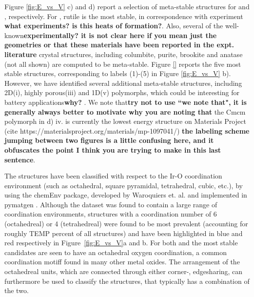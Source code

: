 Figure \ref{fig:E_vs_V} c) and d) report a selection of meta-stable structures for \IrOtwo and \IrOthree, respectively. For \IrOtwo, rutile is the most stable, in correspondence with experiment \cite{}\textbf{what experiments?  is this  heats of formation?}. Also, several of the well-known\textbf{experimentally?  it is not clear here if you mean just the geometries or that these materials have been reported in the expt. literature} crystal structures, including  columbite, purite, brookite and anatase (not all shown) are computed to be meta-stable.
Figure \ref{} reports the five most stable \IrOthree structures, corresponding to labels (1)-(5) in Figure \ref{fig:E_vs_V} b). However, we have identified several additional meta-stable structures, including 2D(i), highly porous(iii) and 1D(v) polymorphs, which could be interesting for battery applications\textbf{why?} \cite{}. We note that\textbf{try not to use ``we note that", it is generally always better to motivate why you are noting that} the Cmcm polymorph in d) iv. is currently the lowest energy structure on Materials Project (cite https://materialsproject.org/materials/mp-1097041/) \cite{} \textbf{the labeling scheme jumping between two figures is a little confusing here, and it obfuscates the point I think you are trying to make in this last sentence}.


%
The structures have been classified with respect to the Ir-O coordination environment
(such as octahedral, square pyramidal, tetrahedral, cubic, etc.),
by using the chemEnv package, developed by Waroquiers et. al. \cite{Waroquiers2017} and implemented in pymatgen \cite{Ong2013}.
%
Although the dataset was found to contain a large range of coordination environments,
structures with a coordination number of 6 (octahedreal) or 4 (tetrahedreal) were found to be most prevalent
(accounting for roughly TEMP percent of all structures)
and have been highlighted in blue and red respectively in Figure~\ref{fig:E_vs_V}a and b.
%
For both \IrOtwo and \IrOthree the most stable candidates are seen to have an octahedral oxygen coordination,
a common coordination motiff found in many other metal oxides.\cite{Waroquiers2017}
%
The arrangement of the octahedreal units, which are connected through either corner-, edgesharing,
can furthermore be used to classify the structures, that typically has a combination of the two. 


